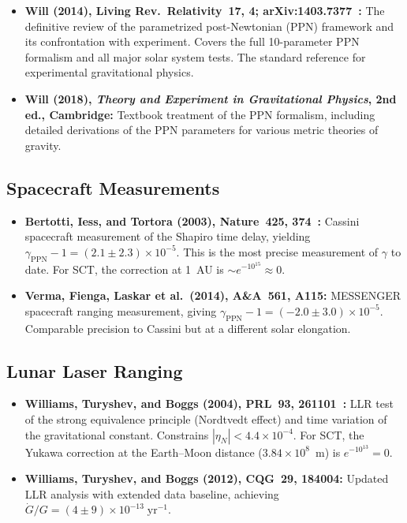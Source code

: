 \documentclass[11pt,a4paper]{article}
\begin{document}
\begin{itemize}[leftmargin=2em]
  \item \textbf{Will (2014), Living Rev.\ Relativity~17, 4;
    arXiv:1403.7377~\cite{will2014}:}
    The definitive review of the parametrized post-Newtonian (PPN) framework
    and its confrontation with experiment. Covers the full 10-parameter PPN
    formalism and all major solar system tests. The standard reference for
    experimental gravitational physics.

  \item \textbf{Will (2018), \textit{Theory and Experiment in Gravitational
    Physics}, 2nd ed., Cambridge:}
    Textbook treatment of the PPN formalism, including detailed derivations
    of the PPN parameters for various metric theories of gravity.
\end{itemize}

\subsection{Spacecraft Measurements}

\begin{itemize}[leftmargin=2em]
  \item \textbf{Bertotti, Iess, and Tortora (2003),
    Nature~425, 374~\cite{bertotti2003}:}
    Cassini spacecraft measurement of the Shapiro time delay, yielding
    $\gamma_{\text{PPN}} - 1 = (2.1 \pm 2.3) \times 10^{-5}$. This is the
    most precise measurement of $\gamma$ to date. For SCT, the correction
    at 1~AU is $\sim e^{-10^{15}} \approx 0$.

  \item \textbf{Verma, Fienga, Laskar et al.\ (2014),
    A\&A~561, A115:}
    MESSENGER spacecraft ranging measurement, giving
    $\gamma_{\text{PPN}} - 1 = (-2.0 \pm 3.0) \times 10^{-5}$.
    Comparable precision to Cassini but at a different solar elongation.
\end{itemize}

\subsection{Lunar Laser Ranging}

\begin{itemize}[leftmargin=2em]
  \item \textbf{Williams, Turyshev, and Boggs (2004),
    PRL~93, 261101~\cite{williams2004}:}
    LLR test of the strong equivalence principle (Nordtvedt effect) and
    time variation of the gravitational constant. Constrains
    $|\eta_N| < 4.4 \times 10^{-4}$. For SCT, the Yukawa correction at the
    Earth--Moon distance ($3.84 \times 10^8$~m) is $e^{-10^{13}} = 0$.

  \item \textbf{Williams, Turyshev, and Boggs (2012),
    CQG~29, 184004:}
    Updated LLR analysis with extended data baseline, achieving
    $\dot{G}/G = (4 \pm 9) \times 10^{-13}\;\text{yr}^{-1}$.
\end{itemize}
\end{document}
